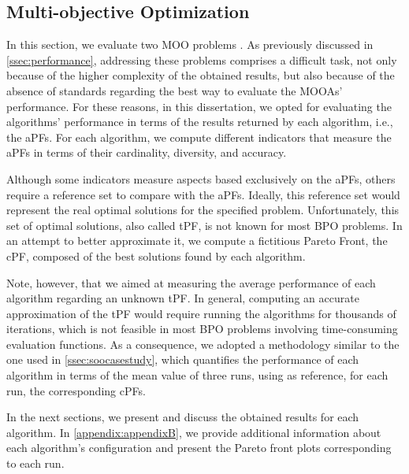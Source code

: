 \subsection{Multi-objective Optimization}

In this section, we evaluate two \ac{MOO} problems \cite{Belem2019MOO,IP2019MOO}. As previously discussed in \cref{ssec:performance}, addressing these problems comprises a difficult task, not only because of the higher complexity of the obtained results, but also because of the absence of standards regarding the best way to evaluate the \acp{MOOA}' performance. For these reasons, in this dissertation, we opted for evaluating the algorithms' performance in terms of the results returned by each algorithm, i.e., the \acp{aPF}. For each algorithm, we compute different indicators that measure the \acp{aPF} in terms of their cardinality, diversity, and accuracy.%

Although some indicators measure aspects based exclusively on the \acp{aPF}, others require a reference set to compare with the \acp{aPF}. Ideally, this reference set would represent the real optimal solutions for the specified problem. Unfortunately, this set of optimal solutions, also called \ac{tPF}, is not known for most \ac{BPO} problems. In an attempt to better approximate it, we compute a fictitious Pareto Front, the \ac{cPF}, composed of the best solutions found by each algorithm. 

Note, however, that we aimed at measuring the average performance of each algorithm regarding an unknown \ac{tPF}. In general, computing an accurate approximation of the \ac{tPF} would require running the algorithms for thousands of iterations, which is not feasible in most \ac{BPO} problems involving time-consuming evaluation functions. As a consequence, we adopted a methodology similar to the one used in \cref{ssec:soocasestudy}, which quantifies the performance of each algorithm in terms of the mean value of three runs, using as reference, for each run, the corresponding \acp{cPF}. 

In the next sections, we present and discuss the obtained results for each algorithm. In \cref{appendix:appendixB}, we provide additional information about each algorithm's configuration and present the Pareto front plots corresponding to each run.

